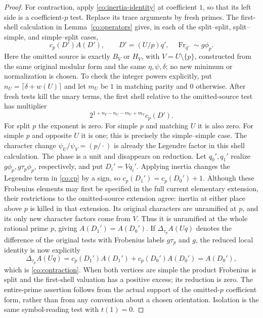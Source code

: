 \begin{proof}
For contraction, apply \eqref{co:inertia-identity} at coefficient
$1$, so that its left side is a coefficient-$p$ test.  Replace its
trace arguments by fresh primes.  The first-shell calculation in
Lemma~\ref{co:operators} gives, in each of the split--split,
split--simple, and simple--split cases,
\[
 c_p(D')A(D'),\qquad D'=(U/p)q',\quad
 \operatorname{Fr}_{q'}\sim g\phi_p.
\]
Here the omitted source is exactly $B_V$ or $H_V$, with
$V=U\setminus\{p\}$, constructed from the same original modular form
and the same $\eta,\psi,\delta$;
no new minimum or normalization is chosen.  To check the integer
powers explicitly, put $n_U=\lceil\delta+w(U)\rceil$ and let
$m_U$ be $1$ in matching parity and $0$ otherwise.  After fresh
tests kill the unary terms, the first shell relative to the
omitted-source test has multiplier
\[
 2^{1+n_V-n_U-m_U+m_V}c_p(D').
\]
For split $p$ the exponent is zero.  For simple $p$ and matching
$U$ it is also zero.  For simple $p$ and opposite $U$ it is one;
this is precisely the simple--simple case.  The character change
$\psi_U/\psi_V=(p/\cdot)$ is already the Legendre factor in this
shell calculation.  The phase is a unit and disappears on reduction.
Let $q_0',q_1'$ realize $g\phi_p,g\tau_p\phi_p$, respectively,
and put $D_i'=Vq_i'$.  Applying inertia changes the Legendre term
in \eqref{co:cp} by a sign, so $c_p(D_1')=c_p(D_0')+1$.
Although these Frobenius elements may first be specified in the full
current elementary extension, their restrictions to the omitted-source
extension agree: inertia
at either place above $p$ is killed in that extension.  Its original
characters are unramified at $p$, and its only new character factors
come from $V$.  Thus it is unramified at the whole rational prime
$p$, giving $A(D_1')=A(D_0')$.  If $\Delta_{\tau_p}A(Uq)$ denotes
the difference of the original tests with Frobenius labels $g\tau_p$
and $g$, the reduced local identity is now explicitly
\[
 \Delta_{\tau_p}A(Uq)
   =c_p(D_1')A(D_1')+c_p(D_0')A(D_0')=A(D_0'),
\]
which is \eqref{co:contraction}.  When both vertices are simple the product
Frobenius is split and the first-shell valuation has a positive
excess; its reduction is zero.  The entire-prime assertion follows
from the actual support of the omitted-$p$ coefficient form, rather
than from any convention about a chosen orientation.  Isolation
is the same symbol-reading test with $t(1)=0$.


\end{proof}
